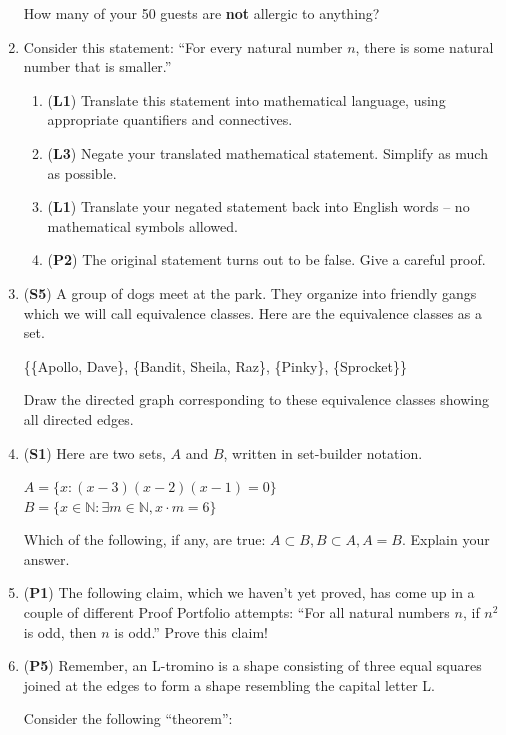 \documentclass[12pt]{article}
\begin{document}
\begin{enumerate}
How many of your 50 guests are \textbf{not} allergic to anything?

\item Consider this statement: ``For every natural number $n$, there is some natural number that is smaller.'' 
\begin{enumerate}
    \item (\textbf{L1}) Translate this statement into mathematical language, using appropriate quantifiers and connectives. 
    \item (\textbf{L3}) Negate your translated mathematical statement. Simplify as much as possible.
    \item (\textbf{L1}) Translate your negated statement back into English words -- no mathematical symbols allowed.
    \item (\textbf{P2}) The original statement turns out to be false. Give a careful proof.
\end{enumerate}


\item  (\textbf{S5}) A group of dogs meet at the park. They organize into friendly gangs which we will call equivalence classes. Here are the equivalence classes as a set. 

\{\{Apollo, Dave\}, \{Bandit, Sheila, Raz\}, \{Pinky\}, \{Sprocket\}\} 

Draw the directed graph corresponding to these equivalence classes showing all directed edges.

\item (\textbf{S1})
Here are two sets, $A$ and $B$, written in set-builder notation. 

$A=\{x: (x-3)(x-2)(x-1)=0\}$ \\
$B=\{x \in \mathbb{N}: \exists m \in \mathbb{N}, x\cdot m=6\}$

Which of the following, if any, are true: $A \subset B, B \subset A, A=B$. Explain your answer.

\item (\textbf{P1}) 
The following claim, which we haven't yet proved, has come up in a couple of different Proof Portfolio attempts: ``For all natural numbers $n$, if $n^2$ is odd, then $n$ is odd.'' Prove this claim!

\item (\textbf{P5})
Remember, an L-tromino is a shape consisting of three equal squares joined at the edges to form a shape resembling the capital letter L.  

Consider the following ``theorem'':  \\


\end{enumerate}
\end{document}
